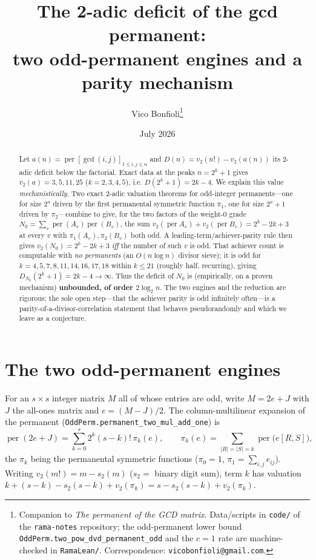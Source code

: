 \documentclass[11pt]{article}
\title{The 2-adic deficit of the gcd permanent:\\
two odd-permanent engines and a parity mechanism}
\author{Vico Bonfioli\thanks{Companion to \emph{The permanent of the
GCD matrix}. Data/scripts in \texttt{code/} of the \texttt{rama-notes} repository; the odd-permanent lower bound
\texttt{OddPerm.two\_pow\_dvd\_permanent\_odd} and the $c=1$ rate are machine-checked in
\texttt{RamaLean/}. Correspondence: \texttt{vicobonfioli@gmail.com}.}}
\date{July 2026}
\theoremstyle{remark}\newtheorem{remark}[theorem]{Remark}
\DeclareMathOperator{\perm}{per}
\newcommand{\vtwo}{v_2}
\begin{document}
\maketitle

\begin{abstract}
Let $a(n)=\perm[\gcd(i,j)]_{1\le i,j\le n}$ and $D(n)=\vtwo(n!)-\vtwo(a(n))$ its 2-adic deficit below
the factorial. Exact data at the peaks $n=2^k+1$ gives $\vtwo(a)=3,5,11,25$ ($k=2,3,4,5$), i.e.
$D(2^k+1)=2k-4$. We explain this value \emph{mechanistically}. Two exact 2-adic valuation theorems for
odd-integer permanents---one for size $2^a$ driven by the first permanental symmetric function
$\pi_1$, one for size $2^a+1$ driven by $\pi_2$---combine to give, for the two factors of the
weight-$0$ grade $N_0=\sum_v\perm(A_v)\perm(B_v)$, the sum $\vtwo(\perm A_v)+\vtwo(\perm B_v)=2^k-2k+3$
at every $v$ with $\pi_1(A_v),\pi_2(B_v)$ both odd. A leading-term/achiever-parity rule then gives
$\vtwo(N_0)=2^k-2k+3$ \emph{iff} the number of such $v$ is odd. That achiever count is computable with
\emph{no permanents} (an $O(n\log n)$ divisor sieve); it is odd for $k=4,5,7,8,11,14,16,17,18$ within
$k\le21$ (roughly half, recurring), giving $D_{N_0}(2^k+1)=2k-4\to\infty$. Thus the deficit of $N_0$ is
(empirically, on a proven mechanism) \textbf{unbounded, of order $2\log_2 n$}. The two engines and the
reduction are rigorous; the sole open step---that the achiever parity is odd infinitely often---is a
parity-of-a-divisor-correlation statement that behaves pseudorandomly and which we leave as a
conjecture.
\end{abstract}

\section{The two odd-permanent engines}

For an $s\times s$ integer matrix $M$ all of whose entries are odd, write $M=2e+J$ with $J$ the
all-ones matrix and $e=(M-J)/2$. The column-multilinear expansion of the permanent
(\texttt{OddPerm.permanent\_two\_mul\_add\_one}) is
\begin{equation}\label{eq:exp}
   \perm(2e+J)=\sum_{k=0}^{s}2^k(s-k)!\,\pi_k(e),
   \qquad
   \pi_k(e)=\sum_{|R|=|S|=k}\perm\big(e[R,S]\big),
\end{equation}
the $\pi_k$ being the permanental symmetric functions ($\pi_0=1$, $\pi_1=\sum_{i,j}e_{ij}$). Writing
$v_2(m!)=m-s_2(m)$ ($s_2=$ binary digit sum), term $k$ has valuation
$k+(s-k)-s_2(s-k)+\vtwo(\pi_k)=s-s_2(s-k)+\vtwo(\pi_k)$.
\end{document}
